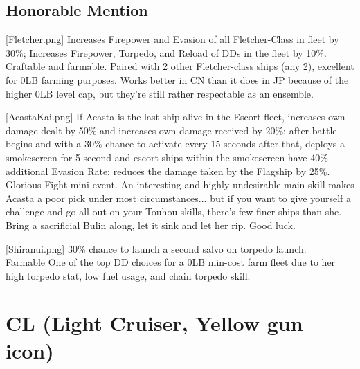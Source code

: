 \newpage
\subsection{ Honorable Mention}
[Fletcher.png]
{Increases Firepower and Evasion of all Fletcher-Class in fleet by 30\%; Increases Firepower, Torpedo, and Reload of DDs in the fleet by 10\%.\\
Craftable and farmable.}
{}
{Paired with 2 other Fletcher-class ships (any 2), excellent for 0LB farming purposes. Works better in CN than it does in JP because of the higher 0LB level cap, but they're still rather respectable as an ensemble.}

[AcastaKai.png]
{If Acasta is the last ship alive in the Escort fleet, increases own damage dealt by 50\% and increases own damage received by 20\%; after battle begins and with a 30\% chance to activate every 15 seconds after that, deploys a smokescreen for 5 second and escort ships within the smokescreen have 40\% additional Evasion Rate; reduces the damage taken by the Flagship by 25\%.\\
Glorious Fight mini-event.}
{}
{An interesting and highly undesirable main skill makes Acasta a poor pick under most circumstances... but if you want to give yourself a challenge and go all-out on your Touhou skills, there's few finer ships than she.\\
Bring a sacrificial Bulin along, let it sink and let her rip. Good luck.}

[Shiranui.png]
{30\% chance to launch a second salvo on torpedo launch.\\
Farmable}
{}
{One of the top DD choices for a 0LB min-cost farm fleet due to her high torpedo stat, low fuel usage, and chain torpedo skill.}
 
 
 
\newpage
\section[CL]{CL (Light Cruiser, Yellow gun icon)}
 

